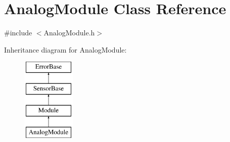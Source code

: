 \hypertarget{classAnalogModule}{\section{\-Analog\-Module \-Class \-Reference}
\label{classAnalogModule}
}


{\ttfamily \#include $<$\-Analog\-Module.\-h$>$}

\-Inheritance diagram for \-Analog\-Module\-:\begin{figure}[H]
\begin{center}
\leavevmode
\includegraphics[height=4.000000cm]{classAnalogModule}
\end{center}
\end{figure}
